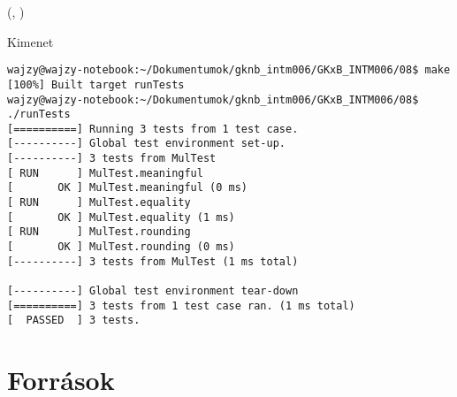 \documentclass[usenames,dvipsnames,aspectratio=169]{beamer}
\begin{document}
\begin{frame}
  \begin{exampleblock}{ %
    (, %
     )}
    \footnotesize
    
    
    
    
  \end{exampleblock}
\end{frame}

\begin{frame}[fragile]
  \begin{block}{Kimenet}
    \scriptsize
    \begin{verbatim}
wajzy@wajzy-notebook:~/Dokumentumok/gknb_intm006/GKxB_INTM006/08$ make
[100%] Built target runTests
wajzy@wajzy-notebook:~/Dokumentumok/gknb_intm006/GKxB_INTM006/08$ ./runTests 
[==========] Running 3 tests from 1 test case.
[----------] Global test environment set-up.
[----------] 3 tests from MulTest
[ RUN      ] MulTest.meaningful
[       OK ] MulTest.meaningful (0 ms)
[ RUN      ] MulTest.equality
[       OK ] MulTest.equality (1 ms)
[ RUN      ] MulTest.rounding
[       OK ] MulTest.rounding (0 ms)
[----------] 3 tests from MulTest (1 ms total)

[----------] Global test environment tear-down
[==========] 3 tests from 1 test case ran. (1 ms total)
[  PASSED  ] 3 tests.
\end{verbatim}
  \end{block}
\end{frame}


\section{Források}
\end{document}
